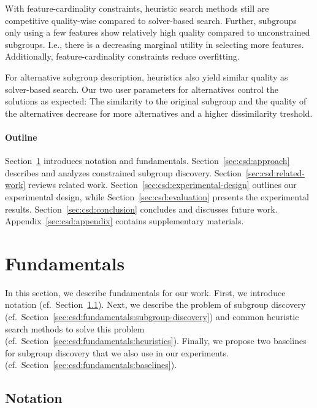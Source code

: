 \documentclass{article}
\theoremstyle{definition}
\begin{document}
With feature-cardinality constraints, heuristic search methods still are competitive quality-wise compared to solver-based search.
Further, subgroups only using a few features show relatively high quality compared to unconstrained subgroups.
I.e., there is a decreasing marginal utility in selecting more features.
Additionally, feature-cardinality constraints reduce overfitting.

For alternative subgroup description, heuristics also yield similar quality as solver-based search.
Our two user parameters for alternatives control the solutions as expected:
The similarity to the original subgroup and the quality of the alternatives decrease for more alternatives and a higher dissimilarity treshold.

\paragraph{Outline}

Section~\ref{sec:csd:fundamentals} introduces notation and fundamentals.
Section~\ref{sec:csd:approach} describes and analyzes constrained subgroup discovery.
Section~\ref{sec:csd:related-work} reviews related work.
Section~\ref{sec:csd:experimental-design} outlines our experimental design, while Section~\ref{sec:csd:evaluation} presents the experimental results.
Section~\ref{sec:csd:conclusion} concludes and discusses future work.
Appendix~\ref{sec:csd:appendix} contains supplementary materials.

\section{Fundamentals}
\label{sec:csd:fundamentals}

In this section, we describe fundamentals for our work.
First, we introduce notation (cf.~Section~\ref{sec:csd:fundamentals:notation}).
Next, we describe the problem of subgroup discovery (cf.~Section~\ref{sec:csd:fundamentals:subgroup-discovery}) and common heuristic search methods to solve this problem (cf.~Section~\ref{sec:csd:fundamentals:heuristics}).
Finally, we propose two baselines for subgroup discovery that we also use in our experiments. (cf.~Section~\ref{sec:csd:fundamentals:baselines}).

\subsection{Notation}
\label{sec:csd:fundamentals:notation}
\end{document}
